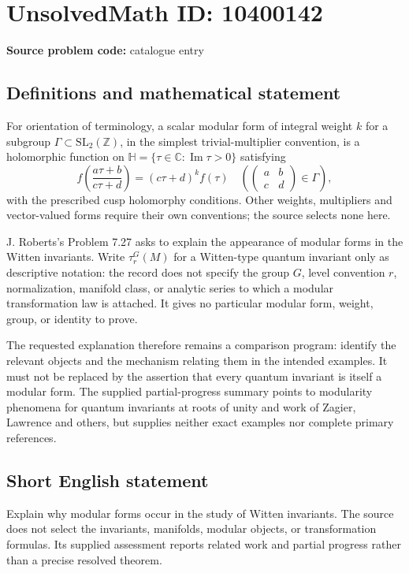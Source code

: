 \documentclass[11pt]{article}
\newcommand{\Z}{\mathbb{Z}}
\newcommand{\C}{\mathbb{C}}
\begin{document}
\section*{UnsolvedMath ID: 10400142}
\textbf{Source problem code:} catalogue entry
\subsection{Definitions and mathematical statement}
For orientation of terminology, a scalar modular form of integral weight \(k\) for a subgroup \(\Gamma\subset\mathrm{SL}_2(\Z)\), in the simplest trivial-multiplier convention, is a holomorphic function on \(\mathbb H=\{\tau\in\C:\operatorname{Im}\tau>0\}\) satisfying
\[
 f\!\left(\frac{a\tau+b}{c\tau+d}\right)
      =(c\tau+d)^k f(\tau)
 \quad\left(\begin{pmatrix}a&b\\c&d\end{pmatrix}\in\Gamma\right),
\]
with the prescribed cusp holomorphy conditions. Other weights, multipliers and vector-valued forms require their own conventions; the source selects none here.

J. Roberts's Problem 7.27 asks to explain the appearance of modular forms in the Witten invariants. Write \(\tau_r^G(M)\) for a Witten-type quantum invariant only as descriptive notation: the record does not specify the group \(G\), level convention \(r\), normalization, manifold class, or analytic series to which a modular transformation law is attached. It gives no particular modular form, weight, group, or identity to prove.

The requested explanation therefore remains a comparison program: identify the relevant objects and the mechanism relating them in the intended examples. It must not be replaced by the assertion that every quantum invariant is itself a modular form. The supplied partial-progress summary points to modularity phenomena for quantum invariants at roots of unity and work of Zagier, Lawrence and others, but supplies neither exact examples nor complete primary references.
\subsection{Short English statement}
Explain why modular forms occur in the study of Witten invariants. The source does not select the invariants, manifolds, modular objects, or transformation formulas. Its supplied assessment reports related work and partial progress rather than a precise resolved theorem.
\end{document}
